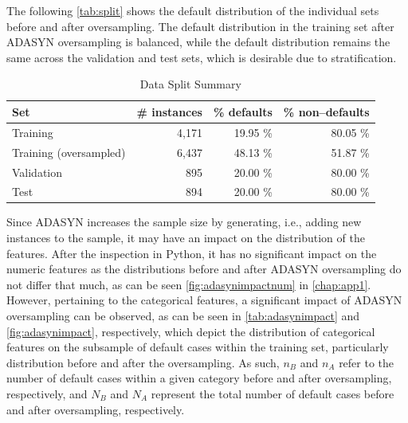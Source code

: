 The following \autoref{tab:split} shows the default distribution of the individual sets before and after oversampling. The default distribution in the training set after ADASYN oversampling is balanced, while the default distribution remains the same across the validation and test sets, which is desirable due to stratification.
\begin{table}[H]
\small
\setlength{\tabcolsep}{8pt}
\renewcommand{\arraystretch}{1.3}
\centering
    \caption[Data Split Summary]{Data Split Summary}\label{tab:split}
    \begin{tabular}{lrrr}
\toprule
\textbf{Set} & \textbf{\# instances} & \textbf{\% defaults} & \textbf{\% non--defaults}\\
\midrule
\hline
Training & 4,171  & 19.95 \% & 80.05 \% \\
Training (oversampled) & 6,437 &  48.13 \% & 51.87 \% \\

Validation & 895 &  20.00 \% & 80.00 \% \\

Test & 894 &  20.00 \% & 80.00 \% \\
\hline
\bottomrule
\end{tabular}
\vspace{0.7em}

\vspace{-1em}
\end{table}
\newpage

Since ADASYN increases the sample size by generating, i.e., adding new instances to the sample, it may have an impact on the distribution of the features.
After the inspection in Python, it has no significant impact on the numeric features as the distributions before and after ADASYN oversampling do not differ that much, as can be seen \autoref{fig:adasynimpactnum} in \autoref{chap:app1}.
However, pertaining to the categorical features, a significant impact of ADASYN oversampling can be observed, as can be seen in \autoref{tab:adasynimpact} and \autoref{fig:adasynimpact}, respectively, which depict the distribution of categorical features on the subsample of default cases within the training set, particularly distribution before and after the oversampling.
As such, $n_B$ and $n_A$ refer to the number of default cases within a given category before and after oversampling, respectively, and $N_B$ and $N_A$ represent the total number of default cases before and after oversampling, respectively.



